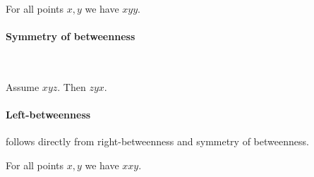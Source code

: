 \documentclass[10pt,a4paper,parskip=half,numbers=endperiod,headings=standardclasses,parskip]{scrbook}
\newcommand{\Betw}[3]{#1 #2 #3}
\begin{document}
  \begin{forthel}
    \begin{lemma} %
      For all points $x, y$ we have $\Betw{x}{y}{y}$.
    \end{lemma}
  \end{forthel}

  \paragraph{Symmetry of betweenness}\

  \begin{forthel}
    \begin{lemma} %
      Assume $\Betw{x}{y}{z}$. Then $\Betw{z}{y}{x}$.
    \end{lemma}
  \end{forthel}

  \paragraph{Left-betweenness} follows directly
  from right-betweenness and symmetry of betweenness.
  \begin{forthel}
    \begin{lemma} %
      For all points $x, y$ we have  $\Betw{x}{x}{y}$.
    \end{lemma}
  \end{forthel}
\end{document}
